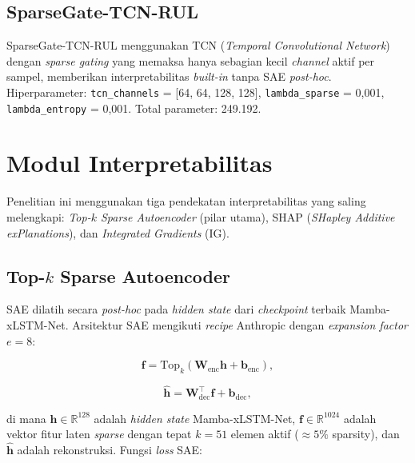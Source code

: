 \subsection{SparseGate-TCN-RUL}
\label{subsec:bab4_sparsegate}

SparseGate-TCN-RUL menggunakan TCN (\emph{Temporal Convolutional
Network}) dengan \emph{sparse gating} yang memaksa hanya sebagian kecil
\emph{channel} aktif per sampel, memberikan interpretabilitas
\emph{built-in} tanpa SAE \emph{post-hoc}.
Hiperparameter: \texttt{tcn\_\allowbreak channels} = [64, 64, 128, 128],
\texttt{lambda\_\allowbreak sparse} = 0{,}001,
\texttt{lambda\_\allowbreak entropy} = 0{,}001.
Total parameter: 249.192.

\section{Modul Interpretabilitas}
\label{sec:bab4_interpretabilitas}

Penelitian ini menggunakan tiga pendekatan interpretabilitas yang
saling melengkapi: \emph{Top-$k$ Sparse Autoencoder} (pilar utama),
SHAP (\emph{SHapley Additive exPlanations}), dan \emph{Integrated
Gradients} (IG).

\subsection{Top-$k$ Sparse Autoencoder}
\label{subsec:bab4_sae}

SAE dilatih secara \emph{post-hoc} pada \emph{hidden state} dari
\emph{checkpoint} terbaik Mamba-xLSTM-Net.
Arsitektur SAE mengikuti \emph{recipe} Anthropic 
dengan \emph{expansion factor} $e = 8$:

\begin{equation}\label{eq:bab4_sae_latent}
\mathbf{f} = \text{Top}_{k}\!\left(\mathbf{W}_{\text{enc}} \mathbf{h} + \mathbf{b}_{\text{enc}}\right),
\end{equation}

\begin{equation}\label{eq:bab4_sae_recon}
\hat{\mathbf{h}} = \mathbf{W}_{\text{dec}}^{\top} \mathbf{f} + \mathbf{b}_{\text{dec}},
\end{equation}

\noindent di mana $\mathbf{h} \in \mathbb{R}^{128}$ adalah \emph{hidden
state} Mamba-xLSTM-Net, $\mathbf{f} \in \mathbb{R}^{1024}$ adalah vektor
fitur laten \emph{sparse} dengan tepat $k = 51$ elemen aktif
($\approx 5\%$ sparsity), dan $\hat{\mathbf{h}}$ adalah rekonstruksi.
Fungsi \emph{loss} SAE:

